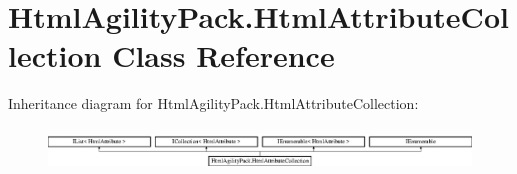 \hypertarget{class_html_agility_pack_1_1_html_attribute_collection}{}\section{Html\+Agility\+Pack.\+Html\+Attribute\+Collection Class Reference}
\label{class_html_agility_pack_1_1_html_attribute_collection}
Inheritance diagram for Html\+Agility\+Pack.\+Html\+Attribute\+Collection\+:\begin{figure}[H]
\begin{center}
\leavevmode
\includegraphics[height=1.176471cm]{class_html_agility_pack_1_1_html_attribute_collection}
\end{center}
\end{figure}
